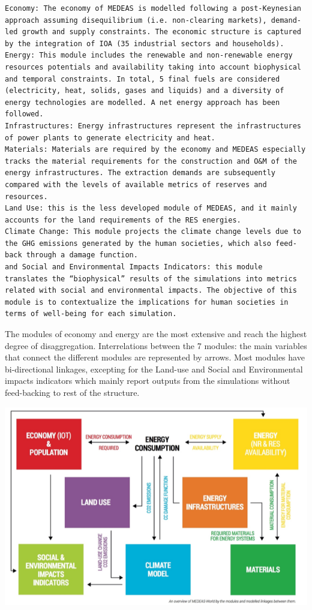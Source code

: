 \documentclass[
]{book}
\begin{document}
\begin{verbatim}
Economy: The economy of MEDEAS is modelled following a post-Keynesian approach assuming disequilibrium (i.e. non-clearing markets), demand-led growth and supply constraints. The economic structure is captured by the integration of IOA (35 industrial sectors and households).
Energy: This module includes the renewable and non-renewable energy resources potentials and availability taking into account biophysical and temporal constraints. In total, 5 final fuels are considered (electricity, heat, solids, gases and liquids) and a diversity of energy technologies are modelled. A net energy approach has been followed.
Infrastructures: Energy infrastructures represent the infrastructures of power plants to generate electricity and heat.
Materials: Materials are required by the economy and MEDEAS especially tracks the material requirements for the construction and O&M of the energy infrastructures. The extraction demands are subsequently compared with the levels of available metrics of reserves and resources.
Land Use: this is the less developed module of MEDEAS, and it mainly accounts for the land requirements of the RES energies.
Climate Change: This module projects the climate change levels due to the GHG emissions generated by the human societies, which also feed-back through a damage function.
and Social and Environmental Impacts Indicators: this module translates the “biophysical” results of the simulations into metrics related with social and environmental impacts. The objective of this module is to contextualize the implications for human societies in terms of well-being for each simulation.
\end{verbatim}

The modules of economy and energy are the most extensive and reach the highest degree of disaggregation. Interrelations between the 7 modules: the main variables that connect the different modules are represented by arrows. Most modules have bi-directional linkages, excepting for the Land-use and Social and Environmental impacts indicators which mainly report outputs from the simulations without feed-backing to rest of the structure.

\includegraphics{fig/medeas.png}
\end{document}
